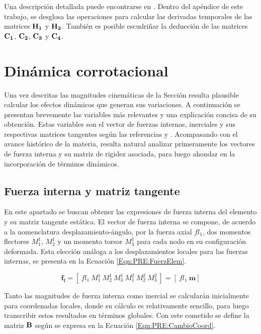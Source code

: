 Una descripción detallada puede encontrarse en \cite{Le2014}. Dentro del apéndice de este trabajo, se desglosa las operaciones para calcular las derivadas temporales de las matrices $\bf{H}_1$ y $\bf{H}_2$. También es posible escudriñar la deducción de las matrices $\bf{C_1}$, $\bf{C_2}$, $\bf{C_3}$ y $\bf{C_4}$.   

\section{Dinámica corrotacional}\label{Subsec:PRE:DinamicCorrot}

Una vez descritas las magnitudes cinemáticas de la Sección \label{Subsec:PRE:CinematicCorrot} resulta plausible calcular los efectos dinámicos que generan sus variaciones. A continuación se presentan brevemente las variables más relevantes y una explicación concisa de su obtención. Estas
variables son el vector de fuerzas internas, inerciales y sus respectivas matrices tangentes según las referencias \citep{Le2014} y \citep{battini2002co}. Acompasando con el avance histórico de la materia, resulta natural analizar primeramente los vectores de fuerza interna y su matriz de rigidez asociada, para luego ahondar en la incorporación de términos dinámicos. 


\subsection{Fuerza interna y matriz tangente}\label{Sec:PRE:Interna}

En este apartado se buscan obtener las expresiones de fuerza interna del elemento y su matriz tangente estática. El vector de fuerza interna se compone, de acuerdo a la nomenclatura desplazamiento-ángulo, por la fuerza axial $fl_1$, dos momentos flectores $M^1_1$, $M^1_2$ y un momento torsor $M^1_3$ para cada nodo en su configuración deformada. Esta elección análoga a los desplazamientos locales para las fuerzas internas, se presenta en la Ecuación \eqref{Eqn:PRE:FuerzElem}. 

\begin{equation}\label{Eqn:PRE:FuerzElem}
\boldsymbol{f_l} =[~fl_1 ~M^1_1~ M^1_2~ M^1_3~ M^2_1~ M^2_2~ M^2_3~] = [~fl_1~\boldsymbol{m}]
\end{equation}

Tanto las magnitudes de fuerza interna como inercial se calcularán inicialmente para coordenadas locales, donde su cálculo es relativamente sencillo, para luego transcribir estos resultados en términos globales. Con este cometido se define la matriz $\bf{B}$ según se expresa en la Ecuación \eqref{Eqn:PRE:CambioCoord}. 

